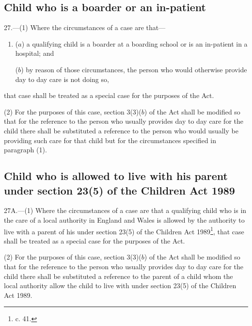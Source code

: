 \documentclass[12pt,a4paper]{article}
\begin{document}
\subsection[27. Child who is a boarder or an in-patient]{Child who is a boarder or an in-patient}

27.—(1) Where the circumstances of a case are that—
\begin{enumerate}\item[]
($a$) a qualifying child is a boarder at a boarding school or is an in-patient in a hospital; and

($b$) by reason of those circumstances, the person who would otherwise provide day to day care is not doing so,
\end{enumerate}
that case shall be treated as a special case for the purposes of the Act.

(2) For the purposes of this case, section 3(3)($b$) of the Act shall be modified so 
that %
for the reference to the person who usually provides day to day care for the child there shall be substituted a reference to the person who would usually be providing such care for that child but for the circumstances specified in paragraph (1).


\subsection[27A. Child who is allowed to live with his parent under section 23(5) of the Children Act 1989]{Child who is allowed to live with his parent under section 23(5) of the Children Act 1989}

27A.—(1) Where the circumstances of a case are that a qualifying child who is in the care of a local authority in England and Wales is allowed by the authority to live with a parent of his under section 23(5) of the Children Act 1989\footnote{ c. 41.}, that case shall be treated as a special case for the purposes of the Act.

(2) For the purposes of this case, section 3(3)($b$) of the Act shall be modified so that for the reference to the person who usually provides day to day care for the child there shall be substituted a reference to the parent of a child whom the local authority allow the child to live with under section 23(5) of the Children Act 1989.
\end{document}
